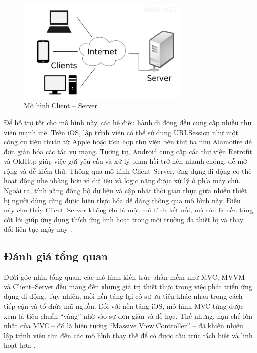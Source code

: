 \begin{figure}[H]
    \centering
    \includegraphics[width=0.75\textwidth]{images/client-server.jpg}
    \caption{Mô hình Client – Server}
    \label{fig:fig14}
  \end{figure}

    \begin{flushleft}
      \hspace*{0.8cm}Để hỗ trợ tốt cho mô hình này, các hệ điều hành di động đều cung cấp nhiều thư viện mạnh mẽ. Trên iOS, lập trình viên có thể sử dụng URLSession như một công cụ tiêu chuẩn từ Apple hoặc tích hợp thư viện bên thứ ba như Alamofire để đơn giản hóa các tác vụ mạng. Tương tự, Android cung cấp các thư viện Retrofit và OkHttp giúp việc gửi yêu cầu và xử lý phản hồi trở nên nhanh chóng, dễ mở rộng và dễ kiểm thử. Thông qua mô hình Client–Server, ứng dụng di động có thể hoạt động nhẹ nhàng hơn vì dữ liệu và logic nặng được xử lý ở phía máy chủ. Ngoài ra, tính năng đồng bộ dữ liệu và cập nhật thời gian thực giữa nhiều thiết bị người dùng cũng được hiện thực hóa dễ dàng thông qua mô hình này. Điều này cho thấy Client–Server không chỉ là một mô hình kết nối, mà còn là nền tảng cốt lõi giúp ứng dụng thích ứng linh hoạt trong môi trường đa thiết bị và thay đổi liên tục ngày nay \cite{scalable_mobile_arch}.
    \end{flushleft}

\subsection{Đánh giá tổng quan}
\renewcommand{\labelitemi}{--}    
    \begin{flushleft}
        \hspace*{0.8cm}Dưới góc nhìn tổng quan, các mô hình kiến trúc phần mềm như MVC, MVVM và Client–Server đều mang đến những giá trị thiết thực trong việc phát triển ứng dụng di động. Tuy nhiên, mỗi nền tảng lại có sự ưu tiên khác nhau trong cách tiếp cận và tổ chức mã nguồn. Đối với nền tảng iOS, mô hình MVC từng được xem là tiêu chuẩn “vàng” nhờ vào sự đơn giản và dễ học. Thế nhưng, hạn chế lớn nhất của MVC – đó là hiện tượng “Massive View Controller” – đã khiến nhiều lập trình viên tìm đến các mô hình thay thế để có được cấu trúc tách biệt và linh hoạt hơn \cite{massive_view_controller}.
    \end{flushleft}

